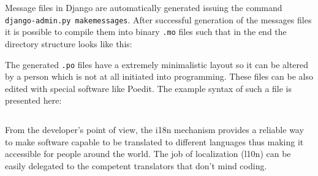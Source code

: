 \documentclass[12pt,oneside,a4paper]{article}
\begin{document}
Message files in Django are automatically generated issuing the command \texttt{django-admin.py makemessages}. After successful generation of the messages files it is possible to compile them into binary \texttt{.mo} files such that in the end the directory structure looks like this:

The generated \texttt{.po} files have a extremely minimalistic layout so it can be altered by a person which is not at all initiated into programming. These files can be also edited with special software like Poedit. The example syntax of such a file is presented here:
\inputminted[linenos,baselinestretch=1,xleftmargin=0.5cm]{python}{src/i18n-2.py}

From the developer's point of view, the i18n mechanism provides a reliable way to make software capable to be translated to different languages thus making it accessible for people around the world. The job of localization (l10n) can be easily delegated to the competent translators that don't mind coding.
\end{document}
